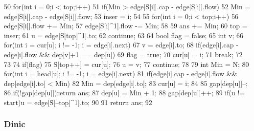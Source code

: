\documentclass[11pt]{article}
\begin{document}
\begin{Code}
{{{50                  for(int i = 0;i < top;i++)
51                      if(Min > edge[S[i]].cap - edge[S[i]].flow){
52                          Min = edge[S[i]].cap - edge[S[i]].flow;
53                          inser = i;
54                      }
55                  for(int i = 0;i < top;i++){
56                      edge[S[i]].flow += Min;
57                      edge[S[i]^1].flow -= Min;
58                  }
59                  ans += Min;
60                  top = inser;
61                  u = edge[S[top]^1].to;
62                  continue;
63              }
64              bool flag = false;
65              int v;
66              for(int i = cur[u]; i != -1; i = edge[i].next){
67                  v = edge[i].to;
68                  if(edge[i].cap - edge[i].flow && dep[v]+1 == dep[u]){
69                       flag = true;
70                       cur[u] = i;
71                       break;
72                  }
73              }
74              if(flag){
75                  S[top++] = cur[u];
76                  u = v;
77                  continue;
78              }
79              int Min = N;
80              for(int i = head[u]; i != -1; i = edge[i].next)
81                  if(edge[i].cap - edge[i].flow && dep[edge[i].to] < Min)
                       {
82                       Min = dep[edge[i].to];
83                       cur[u] = i;
84                  }
85              gap[dep[u]]--;
86              if(!gap[dep[u]])return ans;
87              dep[u] = Min + 1;
88              gap[dep[u]]++;
89              if(u != start)u = edge[S[--top]^1].to;
90       }
91       return ans;
92 }
\end{Code}

\subsubsection{Dinic}
\end{document}
